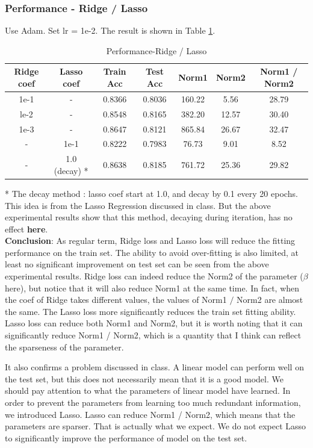 \documentclass{article}
\begin{document}
\subsubsection{Performance - Ridge / Lasso}
Use Adam. Set lr = 1e-2. The result is shown in Table \ref{ridgelasso}.
\begin{table}[H]
    \centering
    \caption {Performance-Ridge / Lasso}
    \label {ridgelasso}
    \begin{tabular}{c|c|c|c|c|c|c}
        \hline 
        Ridge coef& Lasso coef & Train Acc & Test Acc & Norm1 & Norm2 & Norm1 / Norm2\\
        \hline
        1e-1 & - & 0.8366 & 0.8036 & 160.22 & 5.56 & 28.79\\
        le-2 & - & 0.8548 & 0.8165 & 382.20 & 12.57 & 30.40 \\
        1e-3 & - & 0.8647 & 0.8121 & 865.84 & 26.67 & 32.47 \\
        - & 1e-1 & 0.8222 & 0.7983 & 76.73 & 9.01 & 8.52 \\
        - & 1.0 (decay) * & 0.8638 & 0.8185 & 761.72 & 25.36 & 29.82\\
        \hline
    \end{tabular}
\end{table}
* The decay method : lasso coef start at 1.0, and decay by 0.1 every 20 epochs. This idea is from the Lasso Regression discussed in class. But the above experimental results show that this 
method, decaying during iteration, has no effect \textbf{here}. \\

\noindent\textbf{Conclusion}:
As regular term, Ridge loss and Lasso loss will reduce the fitting performance on the train set. The ability to avoid over-fitting is also limited, at least no significant improvement on test set can be seen from the above experimental results.
Ridge loss can indeed reduce the Norm2 of the parameter ($\beta$ here), but notice that it will also reduce Norm1 at the same time. In fact, when the coef of Ridge takes different values, the values of Norm1 $/$ Norm2 are almost the same. The Lasso loss 
more significantly reduces the train set fitting ability. Lasso loss can reduce both Norm1 and Norm2, but it is worth noting that it can significantly reduce Norm1 / Norm2, which is a quantity that I think can reflect the sparseness of the parameter. 

It also confirms a problem discussed in class. A linear model can perform well on the test set, but this does not necessarily mean that it is a good model. We should pay attention to what the parameters of linear model have learned. In order to prevent the parameters from learning too much 
redundant information, we introduced Lasso. Lasso can reduce Norm1 / Norm2, which means that the parameters are sparser. That is actually what we expect. We do not expect Lasso to significantly improve the performance of model on the test set.
\end{document}

